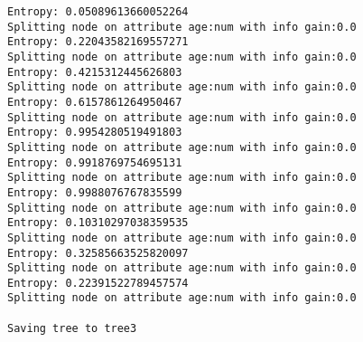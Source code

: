 \documentclass[a4paper,11pt,titlepage]{article}
\begin{document}
\begin{verbatim}
Entropy: 0.05089613660052264
Splitting node on attribute age:num with info gain:0.0
Entropy: 0.22043582169557271
Splitting node on attribute age:num with info gain:0.0
Entropy: 0.4215312445626803
Splitting node on attribute age:num with info gain:0.0
Entropy: 0.6157861264950467
Splitting node on attribute age:num with info gain:0.0
Entropy: 0.9954280519491803
Splitting node on attribute age:num with info gain:0.0
Entropy: 0.9918769754695131
Splitting node on attribute age:num with info gain:0.0
Entropy: 0.9988076767835599
Splitting node on attribute age:num with info gain:0.0
Entropy: 0.10310297038359535
Splitting node on attribute age:num with info gain:0.0
Entropy: 0.32585663525820097
Splitting node on attribute age:num with info gain:0.0
Entropy: 0.22391522789457574
Splitting node on attribute age:num with info gain:0.0

Saving tree to tree3

\end{verbatim}
\end{document}

